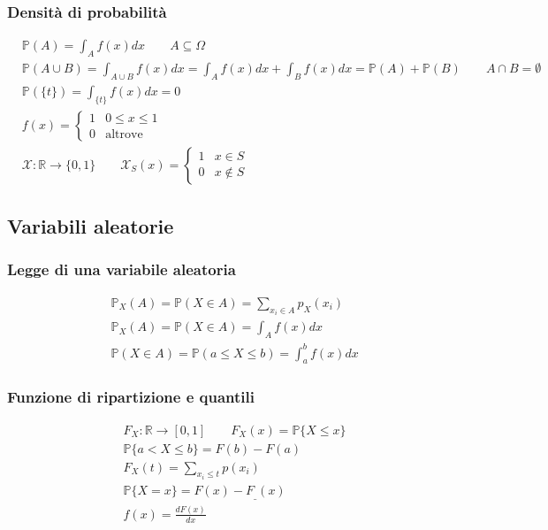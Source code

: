 \subsubsection{Densità di probabilità}
\begin{align} 
	& \mathbb{P}(A) = \int_{A} f(x)dx \quad\quad A \subseteq \Omega \tag{Probabilità di una densità}\\
	& \mathbb{P}(A \cup B) = \int_{A \cup B} f(x)dx = \int_{A} f(x)dx + \int_{B} f(x)dx = \mathbb{P}(A) + \mathbb{P}(B) \quad\quad A \cap B = \emptyset \tag{Somma di probabilità} \\
	& \mathbb{P}(\{t\}) = \int_{\{t\}} f(x)dx=0 \tag{Probabilità di un punto} \\
	& f(x) = \begin{cases}
		1 & 0 \leq x \leq 1 \\
		0 & \text{altrove}
	\end{cases} \tag{Densità uniforme} \\
	& \mathcal{X}: \mathbb{R} \to \{0,1\} \quad\quad \mathcal{X}_S(x) = \begin{cases}
		1 & x \in S \\
		0 & x \notin S
	\end{cases} \tag{Funzione indicatrice}
\end{align}

\subsection{Variabili aleatorie}
\subsubsection{Legge di una variabile aleatoria}

\begin{align}
	& \mathbb{P}_X(A) = \mathbb{P}(X \in A) = \sum_{x_i \in A}p_X(x_i) \tag{Variabile aleatoria discreta} \\
	& \mathbb{P}_X(A) = \mathbb{P}(X \in A) = \int_{A} f(x)dx \tag{Variabile aleatoria continua} \\
	& \mathbb{P}(X \in A) = \mathbb{P}(a \leq X \leq b) = \int_{a}^{b} f(x)dx \tag{Variabile aleatoria continua con segmento}
\end{align}

\subsubsection{Funzione di ripartizione e quantili}
\begin{align}
	& F_X : \mathbb{R} \to [0,1] \quad\quad F_X(x) = \mathbb{P}\{X \leq x\} \tag{Cumulative Distribution Function} \\
	& \mathbb{P}\{a < X \leq b\} = F(b) - F(a) \\
	& F_X(t) = \sum_{x_i \leq t} p(x_i) \tag{c.d.f. discreta} \\
	& \mathbb{P}\{X=x\} = F(x) - F_{\_}(x) \\
	& f(x) = \frac{dF(x)}{dx} \tag{c.d.f. continua}
\end{align}


